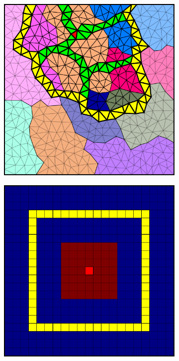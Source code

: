 \begin{figure}[htbp]
\begin{subfigure}[t]{0.3\textwidth}
  \end{subfigure}
  \hfill
  \begin{subfigure}[t]{0.3\textwidth}
    \centerline{\includegraphics[width=0.9\linewidth]{figs/square_tria_metis_cell_supp}}
  \end{subfigure}
  \par\bigskip
  \begin{subfigure}[t]{0.3\textwidth}
    \centerline{\includegraphics[width=0.9\linewidth]{figs/square_cart_struct_cell_init}}

\end{subfigure}
\end{figure}
